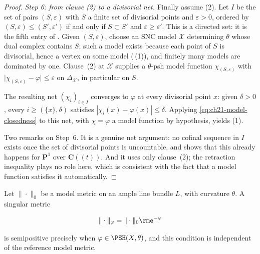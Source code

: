 \begin{proof}
\emph{Step 6: from clause \textup{(2)} to a divisorial net.}
Finally assume (2).  Let $I$ be the set of pairs $(S,\varepsilon)$ with
$S$ a finite set of divisorial points and $\varepsilon>0$, ordered by
$(S,\varepsilon)\leq(S',\varepsilon')$ if and only if $S\subset S'$ and
$\varepsilon\geq\varepsilon'$.  This is a directed set: it is the fifth
entry of .  Given $(S,\varepsilon)$,
choose an SNC model $\mathcal X$ determining $\theta$ whose dual complex
contains $S$; such a model exists because each point of $S$ is
divisorial, hence a vertex on some model
(\,(1)), and finitely many models are
dominated by one.  Clause~(2) at $\mathcal X$ supplies a $\theta$-psh
model function $\chi_{(S,\varepsilon)}$ with
$\lvert\chi_{(S,\varepsilon)}-\varphi\rvert\leq\varepsilon$ on
$\Delta_{\mathcal X}$, in particular on $S$.

The resulting net $(\chi_i)_{i\in I}$ converges to $\varphi$ at every
divisorial point $x$: given $\delta>0$, every
$i\geq(\{x\},\delta)$ satisfies $|\chi_i(x)-\varphi(x)|\leq\delta$.
Applying \eqref{eq:ch21-model-closedness} to this net, with $\chi=\varphi$
a model function by hypothesis, yields (1).

Two remarks on Step~6.  It is a genuine net argument: no cofinal sequence in
$I$ exists once the set of divisorial points is uncountable, and
 shows that this already happens for
$\mathbf P^1$ over $\mathbf C((t))$.  And it uses only clause~(2); the
retraction inequality plays no role here, which is consistent with the fact
that a model function satisfies it automatically.
\end{proof}

\begin{corollary}\label{cor:ch21-reference-independence}
Let $\|\cdot\|_0$ be a model metric on an ample line bundle $L$, with
curvature $\theta$.  A singular metric

\begin{equation}
\label{eq:ch21-singular-metric}
                         \|\cdot\|_\varphi
                         =\|\cdot\|_0\rme^{-\varphi}
\end{equation}

is semipositive precisely when $\varphi\in\PSH(X,\theta)$, and this
condition is independent of the reference model metric.
\end{corollary}

